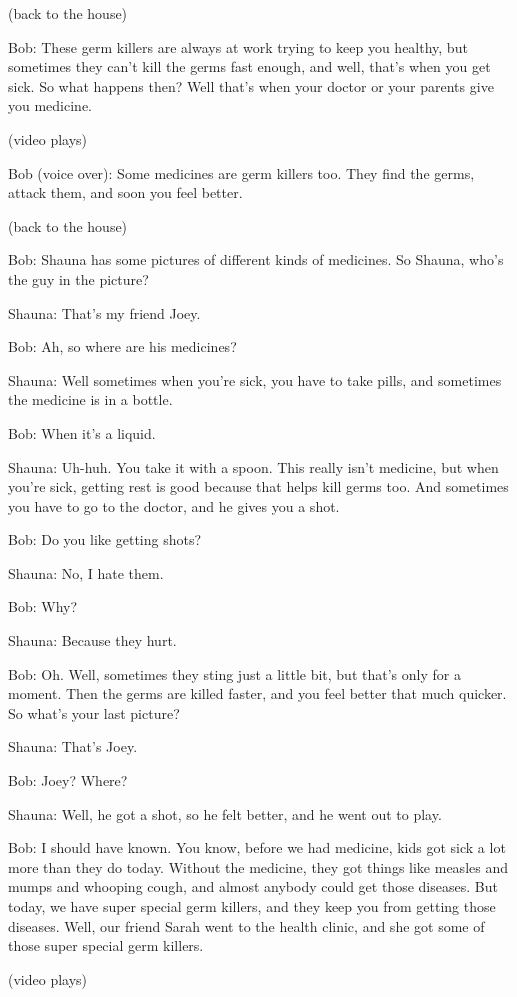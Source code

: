 (back to the house)

Bob: These germ killers are always at work trying to keep you healthy, but sometimes they can't kill the germs fast enough, and well, that's when you get sick. So what happens then? Well that's when your doctor or your parents give you medicine.

(video plays)

Bob (voice over): Some medicines are germ killers too. They find the germs, attack them, and soon you feel better.

(back to the house)

Bob: Shauna has some pictures of different kinds of medicines. So Shauna, who's the guy in the picture?

Shauna: That's my friend Joey.

Bob: Ah, so where are his medicines?

Shauna: Well sometimes when you're sick, you have to take pills, and sometimes the medicine is in a bottle.

Bob: When it's a liquid.

Shauna: Uh-huh. You take it with a spoon. This really isn't medicine, but when you're sick, getting rest is good because that helps kill germs too. And sometimes you have to go to the doctor, and he gives you a shot.

Bob: Do you like getting shots?

Shauna: No, I hate them.

Bob: Why?

Shauna: Because they hurt.

Bob: Oh. Well, sometimes they sting just a little bit, but that's only for a moment. Then the germs are killed faster, and you feel better that much quicker. So what's your last picture?

Shauna: That's Joey.

Bob: Joey? Where?

Shauna: Well, he got a shot, so he felt better, and he went out to play.

Bob: I should have known. You know, before we had medicine, kids got sick a lot more than they do today. Without the medicine, they got things like measles and mumps and whooping cough, and almost anybody could get those diseases. But today, we have super special germ killers, and they keep you from getting those diseases. Well, our friend Sarah went to the health clinic, and she got some of those super special germ killers.

(video plays)

